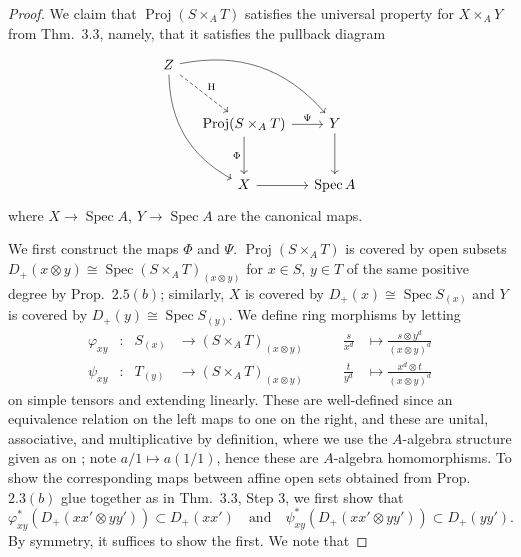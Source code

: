\documentclass[10pt]{article}
\theoremstyle{definition}
\theoremstyle{remark}
\numberwithin{equation}{section}
\numberwithin{figure}{subsubsection}
\DeclareMathOperator{\Spec}{Spec}
\DeclareMathOperator{\Proj}{Proj}
\begin{document}
\begin{proof}
  We claim that $\Proj(S \times_A T)$ satisfies the universal property for $X \times_A Y$ from Thm.~3.3, namely, that it satisfies the pullback diagram
  \begin{equation}\label{fpdiagram}
    \begin{tikzcd}[column sep=small,row sep=large]
      Z\arrow[bend left]{drr}\arrow[bend right]{ddr}\arrow[dashed]{dr}{\mathrm{H}}\\
      &\Proj(S \times_A T)\dar[swap]{\Phi} \rar{\Psi} & Y\dar\\
      &X \rar & \Spec A
    \end{tikzcd}
  \end{equation}
  where $X \to \Spec A$, $Y \to \Spec A$ are the canonical maps.
  \par We first construct the maps $\Phi$ and $\Psi$. $\Proj(S \times_A T)$ is covered by open subsets $D_+(x \otimes y) \cong \Spec(S \times_A T)_{(x \otimes y)}$ for $x \in S$, $y \in T$ of the same positive degree by Prop.~$2.5(b)$; similarly, $X$ is covered by $D_+(x) \cong \Spec S_{(x)}$ and $Y$ is covered by $D_+(y) \cong \Spec S_{(y)}$. We define ring morphisms by letting
  \begin{equation}\label{ringmapsdef}
    \begin{alignedat}{4}
      \varphi_{xy}&\colon & S_{(x)} &\to (S \times_A T)_{(x \otimes y)} \qquad &\frac{s}{x^d} &\mapsto \frac{s \otimes y^d}{(x \otimes y)^d}\\
      \psi_{xy}&\colon & T_{(y)} &\to (S \times_A T)_{(x \otimes y)} \qquad &\frac{t}{y^d} &\mapsto \frac{x^d \otimes t}{(x \otimes y)^d}
    \end{alignedat}
  \end{equation}
  on simple tensors and extending linearly. These are well-defined since an equivalence relation on the left maps to one on the right, and these are unital, associative, and multiplicative by definition, where we use the $A$-algebra structure given as on \cite[p.~31]{AM69}; note $a/1 \mapsto a(1/1)$, hence these are $A$-algebra homomorphisms. To show the corresponding maps between affine open sets obtained from Prop.~$2.3(b)$ glue together as in Thm.~3.3, Step 3, we first show that
  \begin{equation*}
    \varphi_{xy}^*\left( D_+(xx' \otimes yy') \right) \subset D_+(xx') \quad \text{and} \quad \psi_{xy}^*\left( D_+(xx' \otimes yy') \right) \subset D_+(yy').
  \end{equation*}
  By symmetry, it suffices to show the first. We note that

\end{proof}
\end{document}

